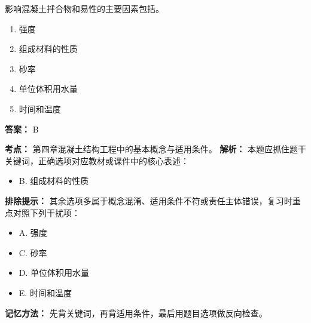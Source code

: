 \documentclass[UTF8,fontset=fandol,11pt]{ctexart}
\begin{document}
\begin{quizbox}[title={第 54 题}]
影响混凝土拌合物和易性的主要因素包括。\\
\begin{enumerate}[label=\Alph*.]
\item 强度
\item 组成材料的性质
\item 砂率
\item 单位体积用水量
\item 时间和温度
\end{enumerate}
\textbf{答案：} B
\vspace{0.25em}
\begin{answerbox}[title={考点解析}]
\textbf{考点：} 第四章混凝土结构工程中的基本概念与适用条件。
\textbf{解析：} 本题应抓住题干关键词，正确选项对应教材或课件中的核心表述：
\begin{itemize}
\item B. 组成材料的性质
\end{itemize}
\textbf{排除提示：} 其余选项多属于概念混淆、适用条件不符或责任主体错误，复习时重点对照下列干扰项：
\begin{itemize}
\item A. 强度
\item C. 砂率
\item D. 单位体积用水量
\item E. 时间和温度
\end{itemize}
\textbf{记忆方法：} 先背关键词，再背适用条件，最后用题目选项做反向检查。
\end{answerbox}
\end{quizbox}
\end{document}
